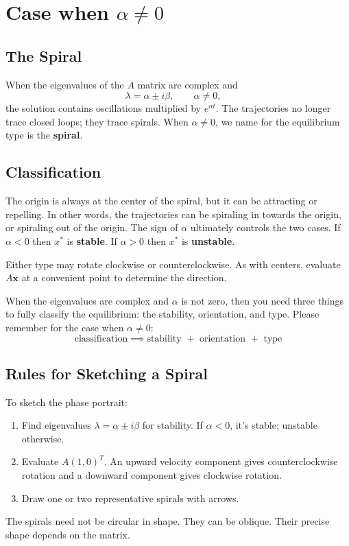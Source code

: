 \documentclass[11pt,letterpaper]{article}
\begin{document}
\section{Case when $\alpha \ne 0$}

\subsection{The Spiral}

When the eigenvalues of the $A$ matrix are complex and 
\[
\lambda=\alpha\pm i\beta,
\qquad \alpha\ne0,\quad 
\]
the solution contains oscillations multiplied by
$e^{\alpha t}$. The trajectories no longer trace closed loops; they trace spirals. When $\alpha\ne0$, we name for the equilibrium type is the \textbf{spiral}. 

\subsection{Classification}


The origin is always at the center of the spiral, but it can be attracting or repelling. In other words, the trajectories can be spiraling in towards the origin, or spiraling out of the origin. The sign of $\alpha$ ultimately controls the two cases. If $\alpha<0$ then $x^*$ is \textbf{stable}. If $\alpha>0$ then $x^*$ is \textbf{unstable}.

Either type may rotate clockwise or counterclockwise.
As with centers, evaluate $A\mathbf{x}$ at a convenient
point to determine the direction. 

When the eigenvalues are complex and $\alpha$ is not zero, then you need three things to fully classify the equilibrium: the stability, orientation, and type. Please remember for the case when $\alpha \ne 0$:
$$
\boxed{\text{classification} \implies\text{stability }+\text{ orientation }+\text{ type}}
$$


\subsection{Rules for Sketching a Spiral}

To sketch the phase portrait:
\begin{enumerate}
    \item Find eigenvalues $\lambda=\alpha\pm i\beta$ for stability. If $\alpha<0$, it's stable; unstable otherwise.
    \item Evaluate $A(1,0)^T$. An upward velocity component gives counterclockwise rotation and a downward component gives clockwise rotation.
    \item Draw one or two representative spirals with arrows.
\end{enumerate}
The spirals need not be circular in shape. They can be oblique. Their
precise shape depends on the matrix.
\end{document}
